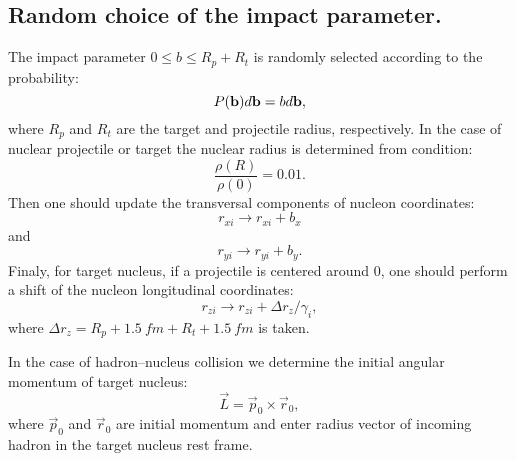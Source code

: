 \subsection{Random choice of the impact parameter.}

\hspace{1.0em}The impact parameter $0 \leq b \leq R_p + R_t$ is randomly
selected according to the probability:
\begin{equation}
\label{NIS11}P({\bf b})d{\bf b} = b d{\bf b},
\end{equation}
where $R_p$ and $R_t$ are the target and projectile radius,
respectively. In the case of nuclear projectile or target the nuclear radius is
determined from condition:
\begin{equation}
\label{NIS12}\frac{\rho(R)}{\rho(0)} = 0.01.
\end{equation}
 Then one should update the transversal components of
nucleon coordinates:
\begin{equation}
\label{NIS13} r_{xi} \rightarrow r_{xi} + b_x
\end{equation}
and
\begin{equation}
\label{NIS14} r_{yi} \rightarrow r_{yi} + b_y.
\end{equation}
Finaly, for target nucleus, if a projectile is centered around $0$, one
should perform a shift of the nucleon longitudinal coordinates:
\begin{equation}
\label{NIS15} r_{zi} \rightarrow r_{zi} + \Delta r_z/\gamma_{i},
\end{equation}
where $\Delta r_z = R_p + 1.5 \ fm + R_t + 1.5 \ fm$ is taken.

In the case of hadron--nucleus collision we determine the initial 
angular momentum 
of target nucleus:
\begin{equation}
\label{NIS16} \vec{L}= \vec{p}_0 \times \vec{r}_0,
\end{equation}
where $\vec{p}_0$ and $\vec{r}_0$ are initial momentum and enter radius vector 
of incoming hadron in the target nucleus rest frame.
